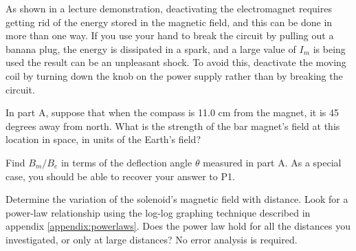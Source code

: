 As shown in a lecture demonstration, deactivating the electromagnet requires getting
rid of the energy stored in the magnetic field, and this can be done in more than one
way. If you use your hand to break the circuit by pulling out a banana plug, the energy
is dissipated in a spark, and a large value of $I_m$ is being used
the result can be an unpleasant shock. To avoid this, deactivate the moving coil by
turning down the knob on the power supply rather than by breaking the circuit.

\prelab

\prelabquestion  In part A, suppose that
when the compass is 11.0 cm from the magnet, it is
45 degrees away from north. What is
the strength of the bar magnet's field at this location in space,
in units of the Earth's field?

\prelabquestion Find $B_m/B_e$ in terms of the deflection angle $\theta$ measured in part A. As a special
case, you should be able to recover your answer to P1.

\analysis

Determine the variation of the solenoid's magnetic
field with distance. 
Look for a power-law relationship using the log-log graphing technique described in 
appendix \ref{appendix:powerlaws}. Does the power law hold for
all the distances you investigated, or only at large distances?
No error analysis is required.
